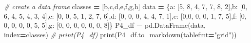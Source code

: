 \documentclass[
]{article}
\newenvironment{Shaded}{\begin{snugshade}}{\end{snugshade}}
\newcommand{\BuiltInTok}[1]{#1}
\newcommand{\CommentTok}[1]{\textcolor[rgb]{0.56,0.35,0.01}{\textit{#1}}}
\newcommand{\DecValTok}[1]{\textcolor[rgb]{0.00,0.00,0.81}{#1}}
\newcommand{\NormalTok}[1]{#1}
\newcommand{\OperatorTok}[1]{\textcolor[rgb]{0.81,0.36,0.00}{\textbf{#1}}}
\newcommand{\StringTok}[1]{\textcolor[rgb]{0.31,0.60,0.02}{#1}}
\begin{document}
\begin{Shaded}
\begin{Highlighting}[]
\CommentTok{\# create a data frame}
\NormalTok{classes }\OperatorTok{=}\NormalTok{ [}\StringTok{\textquotesingle{}b\textquotesingle{}}\NormalTok{,}\StringTok{\textquotesingle{}c\textquotesingle{}}\NormalTok{,}\StringTok{\textquotesingle{}d\textquotesingle{}}\NormalTok{,}\StringTok{\textquotesingle{}e\textquotesingle{}}\NormalTok{,}\StringTok{\textquotesingle{}f\textquotesingle{}}\NormalTok{,}\StringTok{\textquotesingle{}g\textquotesingle{}}\NormalTok{,}\StringTok{\textquotesingle{}h\textquotesingle{}}\NormalTok{]}
\NormalTok{data }\OperatorTok{=}\NormalTok{ \{}\StringTok{\textquotesingle{}a\textquotesingle{}}\NormalTok{: [}\DecValTok{5}\NormalTok{, }\DecValTok{8}\NormalTok{, }\DecValTok{4}\NormalTok{, }\DecValTok{7}\NormalTok{, }\DecValTok{7}\NormalTok{, }\DecValTok{8}\NormalTok{, }\DecValTok{2}\NormalTok{],}\StringTok{\textquotesingle{}b\textquotesingle{}}\NormalTok{: [}\DecValTok{0}\NormalTok{, }\DecValTok{6}\NormalTok{, }\DecValTok{4}\NormalTok{, }\DecValTok{5}\NormalTok{, }\DecValTok{4}\NormalTok{, }\DecValTok{3}\NormalTok{, }\DecValTok{4}\NormalTok{],}\StringTok{\textquotesingle{}c\textquotesingle{}}\NormalTok{: [}\DecValTok{0}\NormalTok{, }\DecValTok{0}\NormalTok{, }\DecValTok{5}\NormalTok{, }\DecValTok{1}\NormalTok{, }\DecValTok{2}\NormalTok{, }\DecValTok{7}\NormalTok{, }\DecValTok{6}\NormalTok{],}\StringTok{\textquotesingle{}d\textquotesingle{}}\NormalTok{: [}\DecValTok{0}\NormalTok{, }\DecValTok{0}\NormalTok{, }\DecValTok{0}\NormalTok{, }\DecValTok{4}\NormalTok{, }\DecValTok{4}\NormalTok{, }\DecValTok{7}\NormalTok{, }\DecValTok{1}\NormalTok{],}\StringTok{\textquotesingle{}e\textquotesingle{}}\NormalTok{: [}\DecValTok{0}\NormalTok{,}\DecValTok{0}\NormalTok{, }\DecValTok{0}\NormalTok{, }\DecValTok{0}\NormalTok{, }\DecValTok{1}\NormalTok{, }\DecValTok{7}\NormalTok{, }\DecValTok{5}\NormalTok{],}\StringTok{\textquotesingle{}f\textquotesingle{}}\NormalTok{: [}\DecValTok{0}\NormalTok{, }\DecValTok{0}\NormalTok{, }\DecValTok{0}\NormalTok{, }\DecValTok{0}\NormalTok{, }\DecValTok{0}\NormalTok{, }\DecValTok{5}\NormalTok{, }\DecValTok{5}\NormalTok{],}\StringTok{\textquotesingle{}g\textquotesingle{}}\NormalTok{: [}\DecValTok{0}\NormalTok{, }\DecValTok{0}\NormalTok{, }\DecValTok{0}\NormalTok{, }\DecValTok{0}\NormalTok{, }\DecValTok{0}\NormalTok{, }\DecValTok{0}\NormalTok{, }\DecValTok{8}\NormalTok{]\}}
\NormalTok{P4\_df }\OperatorTok{=}\NormalTok{ pd.DataFrame(data, index}\OperatorTok{=}\NormalTok{classes)}
\CommentTok{\# print(P4\_df)}
\BuiltInTok{print}\NormalTok{(P4\_df.to\_markdown(tablefmt}\OperatorTok{=}\StringTok{"grid"}\NormalTok{))}
\end{Highlighting}
\end{Shaded}
\end{document}
